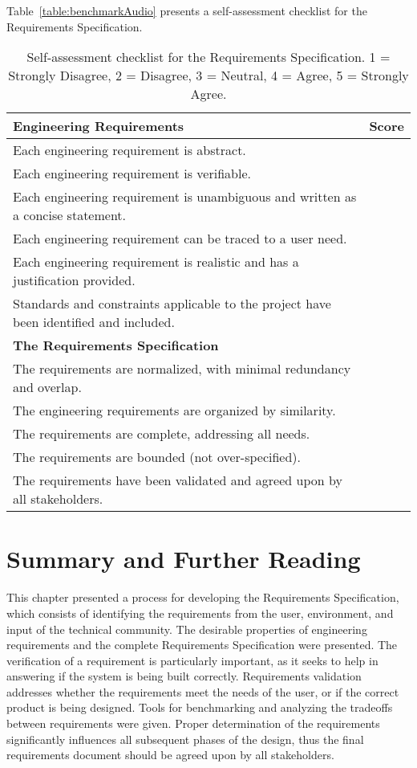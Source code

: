 Table~\ref{table:benchmarkAudio} presents a self-assessment checklist for the Requirements
 Specification.
  
\begin{table}
\centering
\caption{Self-assessment checklist for the Requirements
Specification. 1 = Strongly Disagree, 2 = Disagree, 3 = Neutral, 4 =
Agree, 5 = Strongly Agree.}

\label{table:requirementsCheckList}
\begin{tabular}{ |p{10cm}|l|} 
\hline
\rowcolor{Gray}
\textbf{Engineering Requirements} & \textbf{Score}\\ \hline
Each engineering requirement is abstract. & \\ \hline
Each engineering requirement is verifiable. & \\ \hline
Each engineering requirement is unambiguous and written as a concise
statement. & \\ \hline
Each engineering requirement can be traced to a user need. & \\ \hline
Each engineering requirement is realistic and has a justification
provided. & \\ \hline
Standards and constraints applicable to the project have been identified
and included. & \\ \hline

\rowcolor{Gray}
\textbf{The Requirements Specification} & \\ \hline
The requirements are normalized, with minimal redundancy and overlap.
& \\ \hline
The engineering requirements are organized by similarity. & \\ \hline
The requirements are complete, addressing all needs. & \\ \hline
The requirements are bounded (not over-specified). & \\ \hline
The requirements have been validated and agreed upon by all
stakeholders. & \\ \hline
\end{tabular}
\end{table}

\section{Summary and Further Reading }
\label{section:summary-and-further-reading}

This chapter presented a process for developing the Requirements
Specification, which consists of identifying the requirements from the
user, environment, and input of the technical community. The desirable
properties of engineering requirements and the complete Requirements
Specification were presented. The verification of a requirement is
particularly important, as it seeks to help in answering if the system
is being built correctly. Requirements validation addresses whether the
requirements meet the needs of the user, or if the correct product is
being designed. Tools for benchmarking and analyzing the tradeoffs
between requirements were given. Proper determination of the
requirements significantly influences all subsequent phases of the
design, thus the final requirements document should be agreed upon by
all stakeholders.

